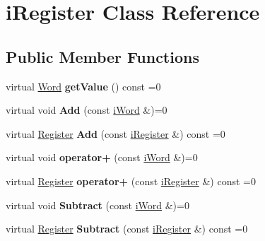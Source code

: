 \hypertarget{classiRegister}{
\section{iRegister Class Reference}
\label{classiRegister}
}
\subsection*{Public Member Functions}
\begin{DoxyCompactItemize}
\item 
\hypertarget{classiRegister_a80455205be5dbbb08798ef5cc5d17eff}{
virtual \hyperlink{classWord}{Word} {\bfseries getValue} () const =0}
\label{classiRegister_a80455205be5dbbb08798ef5cc5d17eff}

\item 
\hypertarget{classiRegister_a04c04487fb26b63dfd02ac46f30836a5}{
virtual void {\bfseries Add} (const \hyperlink{classiWord}{iWord} \&)=0}
\label{classiRegister_a04c04487fb26b63dfd02ac46f30836a5}

\item 
\hypertarget{classiRegister_aa24da0ef051cb2c8bae6d8ada2cfbd36}{
virtual \hyperlink{classRegister}{Register} {\bfseries Add} (const \hyperlink{classiRegister}{iRegister} \&) const =0}
\label{classiRegister_aa24da0ef051cb2c8bae6d8ada2cfbd36}

\item 
\hypertarget{classiRegister_afda32a5787c078c01a80714e036a7aad}{
virtual void {\bfseries operator+} (const \hyperlink{classiWord}{iWord} \&)=0}
\label{classiRegister_afda32a5787c078c01a80714e036a7aad}

\item 
\hypertarget{classiRegister_a36266f3005cfab5e84a96478936c89d1}{
virtual \hyperlink{classRegister}{Register} {\bfseries operator+} (const \hyperlink{classiRegister}{iRegister} \&) const =0}
\label{classiRegister_a36266f3005cfab5e84a96478936c89d1}

\item 
\hypertarget{classiRegister_a86ebf3b7956c53dbaf4ead536c329290}{
virtual void {\bfseries Subtract} (const \hyperlink{classiWord}{iWord} \&)=0}
\label{classiRegister_a86ebf3b7956c53dbaf4ead536c329290}

\item 
\hypertarget{classiRegister_addc903e18199f457ed4f0a3f314d3039}{
virtual \hyperlink{classRegister}{Register} {\bfseries Subtract} (const \hyperlink{classiRegister}{iRegister} \&) const =0}
\label{classiRegister_addc903e18199f457ed4f0a3f314d3039}


\end{DoxyCompactItemize}
